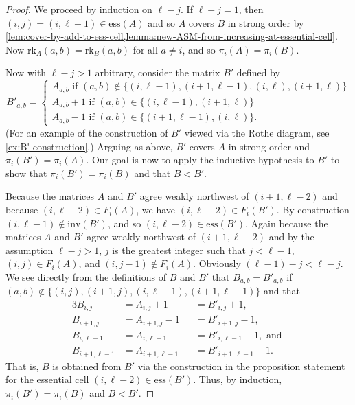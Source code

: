 \documentclass[12 pt]{amsart}
\numberwithin{equation}{section}
\newcommand{\rk}{\mathrm{rk}}
\newcommand{\ess}{\mathrm{ess}}
\newcommand{\inv}{\mathrm{inv}}
\theoremstyle{remark}
\begin{document}
   \begin{proof}
      We proceed by induction on $\ell-j$.  If $\ell-j = 1$, then $(i,j) = (i,\ell-1) \in \ess(A)$ and so $A$ covers $B$ in strong order by \cref{lem:cover-by-add-to-ess-cell,lemma:new-ASM-from-increasing-at-essential-cell}.  Now $\rk_A(a,b) = \rk_B(a,b)$ for all $a \neq i$, and so $\pi_i(A) = \pi_i(B)$.

          Now with $\ell-j>1$ arbitrary, consider the matrix $B'$ defined by \[
    B'_{a,b} = \begin{cases}
        A_{a,b} \text{ if } (a,b) \notin \{(i,\ell-1), (i+1,\ell-1), (i, \ell), (i+1,\ell)\}\\
        A_{a,b}+1 \text{ if } (a,b) \in \{(i,\ell-1), (i+1,\ell)\}\\
        A_{a,b}-1 \text{ if } (a,b) \in \{(i+1,\ell-1), (i,\ell)\}.
    \end{cases} 
    \]      (For an example of the construction of $B'$ viewed via the Rothe diagram, see \cref{ex:B'-construction}.)  Arguing as above, $B'$ covers $A$ in strong order and $\pi_i(B') = \pi_i(A)$. Our goal is now to apply the inductive hypothesis to $B'$ to show that $\pi_i(B') = \pi_i(B)$ and that $B < B'$. 
    
    Because the matrices $A$ and $B'$ agree weakly northwest of $(i+1,\ell-2)$ and because $(i,\ell-2) \in F_i(A)$, we have $(i,\ell-2) \in F_i(B')$. By construction $(i,\ell-1) \notin \inv(B')$, and so $(i,\ell-2) \in \ess(B')$. Again because the matrices $A$ and $B'$ agree weakly northwest of $(i+1,\ell-2)$ and by the assumption $\ell-j>1$, $j$ is the greatest integer such that $j < \ell-1$, $(i,j) \in F_i(A)$, and $(i,j-1) \notin F_i(A)$.  Obviously $(\ell-1)-j<\ell-j$.  We see directly from the definitions of $B$ and $B'$ that $B_{a,b} = B'_{a,b}$ if $(a,b) \notin \{(i,j),(i+1,j), (i,\ell-1), (i+1,\ell-1)\}$ and that 
    \begin{alignat*}{3}
    B_{i,j} &= A_{i,j}+1 &&= B'_{i,j}+1, \\
    B_{i+1,j} & = A_{i+1,j}-1 &&= B'_{i+1,j}-1,\\
    B_{i,\ell-1} &= A_{i,\ell-1}&& = B'_{i,\ell-1}-1, \text{ and } \\
    B_{i+1,\ell-1}& = A_{i+1,\ell-1}&&= B'_{i+1,\ell-1}+1.
    \end{alignat*}
That is, $B$ is obtained from $B'$ via the construction in the proposition statement for the essential cell $(i, \ell-2) \in \ess(B')$. Thus, by induction, $\pi_i(B') = \pi_i(B)$ and $B<B'$. 
   \end{proof}
\end{document}
